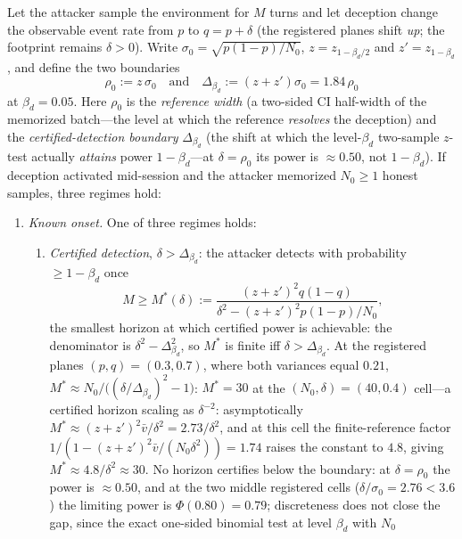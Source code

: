\begin{theorem}\label{thm:onset}
Let the attacker sample the environment for $M$ turns and let deception
change the observable event rate from $p$ to $q=p+\delta$ (the registered
planes shift \emph{up}; the footprint remains $\delta>0$). Write
$\sigma_0=\sqrt{p(1-p)/N_0}$, $z=z_{1-\beta_d/2}$ and $z'=z_{1-\beta_d}$,
and define the two boundaries
\[
\rho_0:=z\,\sigma_0
\quad\text{and}\quad
\Delta_{\beta_d}:=(z+z')\sigma_0=1.84\,\rho_0
\]
at $\beta_d=0.05$. Here $\rho_0$ is the \emph{reference width} (a two-sided CI half-width of the
memorized batch---the level at which the reference \emph{resolves} the
deception) and the \emph{certified-detection boundary} $\Delta_{\beta_d}$
(the shift at which the level-$\beta_d$ two-sample $z$-test actually
\emph{attains} power $1-\beta_d$---at $\delta=\rho_0$ its power is
$\approx0.50$, not $1-\beta_d$). If deception activated mid-session and
the attacker memorized $N_0\ge1$ honest samples, three regimes hold:
\begin{enumerate}[label=(\roman*),leftmargin=2em]
\item \emph{Known onset.} One of three regimes holds:
  \begin{enumerate}[label=(\alph*),leftmargin=2em]
  \item \emph{Certified detection}, $\delta>\Delta_{\beta_d}$: the
        attacker detects with probability $\ge1-\beta_d$ once
        \[
        M\ge M^{*}(\delta):=
        \frac{(z+z')^{2}q(1-q)}
        {\delta^{2}-(z+z')^{2}p(1-p)/N_0},
        \]
        the smallest horizon at which certified power is achievable:
        the denominator is $\delta^{2}-\Delta_{\beta_d}^{2}$, so
        $M^{*}$ is finite iff $\delta>\Delta_{\beta_d}$.
        At the registered planes $(p,q)=(0.3,0.7)$, where both variances equal $0.21$,
        $M^{*}\approx N_0/\bigl((\delta/\Delta_{\beta_d})^{2}-1\bigr)$:
        $M^{*}=30$ at the $(N_0,\delta)=(40,0.4)$ cell---a certified
        horizon scaling as $\delta^{-2}$: asymptotically
        $M^{*}\approx(z+z')^{2}\bar v/\delta^{2}=2.73/\delta^{2}$, and
        at this cell the finite-reference factor
        $1/(1-(z+z')^{2}\bar v/(N_0\delta^{2}))=1.74$ raises the constant
        to $4.8$, giving $M^{*}\approx4.8/\delta^{2}\approx30$. No
        horizon certifies below the boundary: at $\delta=\rho_0$ the
        power is $\approx0.50$, and at the two middle registered cells
        ($\delta/\sigma_0=2.76<3.6$) the limiting power is
        $\Phi(0.80)=0.79$; discreteness does not close the gap, since the
        exact one-sided binomial test at level $\beta_d$ with $N_0$

\end{enumerate}
\end{enumerate}
\end{theorem}
